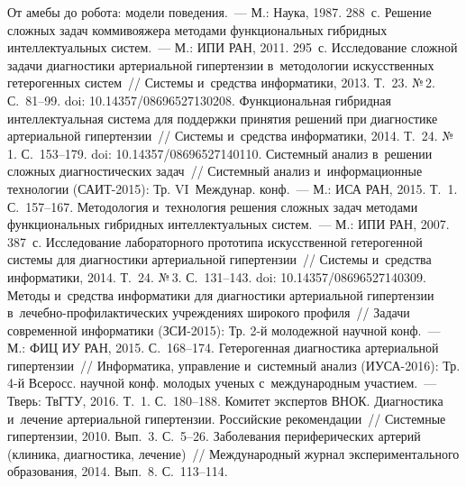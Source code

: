 \begin{multicols}{2}
{\small\frenchspacing
 {%
 \begin{thebibliography}{99}
 От амебы до робота: модели поведения.~--- 
М.: Наука, 1987. 288~с.
 Решение 
сложных задач коммивояжера методами функциональных гибридных интеллектуальных 
сис\-тем.~--- М.: ИПИ РАН, 2011. 295~с.
 Исследование сложной задачи 
диагностики артериальной гипертензии в~методологии искусственных гетерогенных  
сис\-тем~// Системы и~средства информатики, 2013. Т.~23. №\,2. С.~81--99. doi: 
10.14357/08696527130208.
 Функциональная гибридная 
интеллектуальная система для поддержки принятия решений при диагностике артериальной 
гипертензии~// Системы и~средства информатики, 2014. Т.~24. №\,1. С.~153--179. doi: 
10.14357/08696527140110.
 Системный 
анализ в~решении сложных диагностических задач~// Системный анализ и~информационные 
технологии (САИТ-2015): Тр. VI~Междунар. конф.~--- М.: 
ИСА РАН, 2015. Т.~1. С.~157--167.
 Методология и~технология решения сложных задач 
методами функциональных гибридных интеллектуальных систем.~--- М.: ИПИ РАН, 2007. 
387~с.
 Исследование лабораторного 
прототипа искусственной гетерогенной системы для диагностики артериальной 
гипертензии~// Системы и~средства информатики, 2014. Т.~24. №\,3. С.~131--143. doi: 
10.14357/08696527140309.
 Методы и~средства информатики для диагностики 
артериальной гипертензии в~ле\-чеб\-но-про\-фи\-лак\-ти\-че\-ских учреждениях 
широкого профиля~// Задачи современной информатики (ЗСИ-2015): Тр. 2-й 
молодежной научной конф.~--- М.: ФИЦ ИУ РАН, 2015. 
С.~168--174.
 Гетерогенная диагностика артериальной 
гипертензии~// Информатика, управление и~системный анализ (ИУСА-2016): Тр. 
4-й Всеросс. научной конф. молодых ученых с~международным участием.~--- 
Тверь: ТвГТУ, 2016. Т.~1. С.~180--188.
Комитет экспертов ВНОК. Диагностика и~лечение артериальной гипертензии. 
Российские рекомендации~// Системные гипертензии, 2010. Вып.~3. С.~5--26.
 Заболевания периферических артерий (клиника, 
диагностика, лечение)~// Международный журнал экспериментального образования, 
2014. Вып.~8. С.~113--114. 

\end{thebibliography}

 }
 }

\end{multicols}


